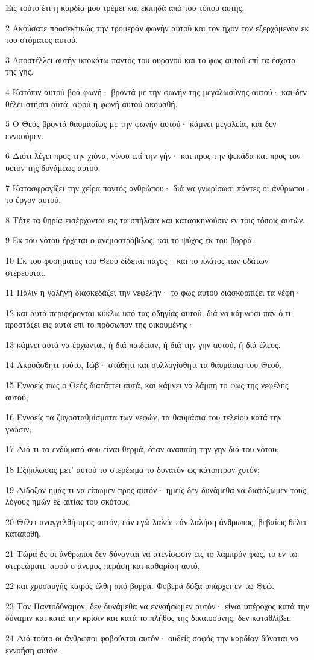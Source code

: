 \par Εις τούτο έτι η καρδία μου τρέμει και εκπηδά από του τόπου αυτής.
\par 2 Ακούσατε προσεκτικώς την τρομεράν φωνήν αυτού και τον ήχον τον εξερχόμενον εκ του στόματος αυτού.
\par 3 Αποστέλλει αυτήν υποκάτω παντός του ουρανού και το φως αυτού επί τα έσχατα της γης.
\par 4 Κατόπιν αυτού βοά φωνή· βροντά με την φωνήν της μεγαλωσύνης αυτού· και δεν θέλει στήσει αυτά, αφού η φωνή αυτού ακουσθή.
\par 5 Ο Θεός βροντά θαυμασίως με την φωνήν αυτού· κάμνει μεγαλεία, και δεν εννοούμεν.
\par 6 Διότι λέγει προς την χιόνα, γίνου επί την γήν· και προς την ψεκάδα και προς τον υετόν της δυνάμεως αυτού.
\par 7 Κατασφραγίζει την χείρα παντός ανθρώπου· διά να γνωρίσωσι πάντες οι άνθρωποι το έργον αυτού.
\par 8 Τότε τα θηρία εισέρχονται εις τα σπήλαια και κατασκηνούσιν εν τοις τόποις αυτών.
\par 9 Εκ του νότου έρχεται ο ανεμοστρόβιλος, και το ψύχος εκ του βορρά.
\par 10 Εκ του φυσήματος του Θεού δίδεται πάγος· και το πλάτος των υδάτων στερεούται.
\par 11 Πάλιν η γαλήνη διασκεδάζει την νεφέλην· το φως αυτού διασκορπίζει τα νέφη·
\par 12 και αυτά περιφέρονται κύκλω υπό τας οδηγίας αυτού, διά να κάμνωσι παν ό,τι προστάζει εις αυτά επί το πρόσωπον της οικουμένης·
\par 13 κάμνει αυτά να έρχωνται, ή διά παιδείαν, ή διά την γην αυτού, ή διά έλεος.
\par 14 Ακροάσθητι τούτο, Ιώβ· στάθητι και συλλογίσθητι τα θαυμάσια του Θεού.
\par 15 Εννοείς πως ο Θεός διατάττει αυτά, και κάμνει να λάμπη το φως της νεφέλης αυτού;
\par 16 Εννοείς τα ζυγοσταθμίσματα των νεφών, τα θαυμάσια του τελείου κατά την γνώσιν;
\par 17 Διά τι τα ενδύματά σου είναι θερμά, όταν αναπαύη την γην διά του νότου;
\par 18 Εξήπλωσας μετ' αυτού το στερέωμα το δυνατόν ως κάτοπτρον χυτόν;
\par 19 Δίδαξον ημάς τι να είπωμεν προς αυτόν· ημείς δεν δυνάμεθα να διατάξωμεν τους λόγους ημών εξ αιτίας του σκότους.
\par 20 Θέλει αναγγελθή προς αυτόν, εάν εγώ λαλώ; εάν λαλήση άνθρωπος, βεβαίως θέλει καταποθή.
\par 21 Τώρα δε οι άνθρωποι δεν δύνανται να ατενίσωσιν εις το λαμπρόν φως, το εν τω στερεώματι, αφού ο άνεμος περάση και καθαρίση αυτό,
\par 22 και χρυσαυγής καιρός έλθη από βορρά. Φοβερά δόξα υπάρχει εν τω Θεώ.
\par 23 Τον Παντοδύναμον, δεν δυνάμεθα να εννοήσωμεν αυτόν· είναι υπέροχος κατά την δύναμιν και κατά την κρίσιν και κατά το πλήθος της δικαιοσύνης, δεν καταθλίβει.
\par 24 Διά τούτο οι άνθρωποι φοβούνται αυτόν· ουδείς σοφός την καρδίαν δύναται να εννοήση αυτόν.

